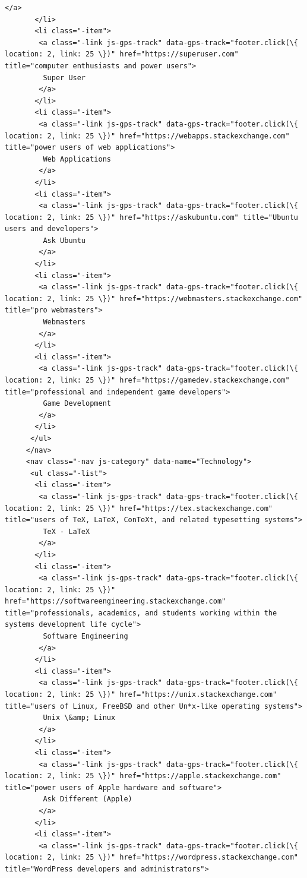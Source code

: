 \documentclass[11pt]{article}
\begin{document}
\begin{Verbatim}[commandchars=\\\{\}]
        </a>
       </li>
       <li class="-item">
        <a class="-link js-gps-track" data-gps-track="footer.click(\{ location: 2, link: 25 \})" href="https://superuser.com" title="computer enthusiasts and power users">
         Super User
        </a>
       </li>
       <li class="-item">
        <a class="-link js-gps-track" data-gps-track="footer.click(\{ location: 2, link: 25 \})" href="https://webapps.stackexchange.com" title="power users of web applications">
         Web Applications
        </a>
       </li>
       <li class="-item">
        <a class="-link js-gps-track" data-gps-track="footer.click(\{ location: 2, link: 25 \})" href="https://askubuntu.com" title="Ubuntu users and developers">
         Ask Ubuntu
        </a>
       </li>
       <li class="-item">
        <a class="-link js-gps-track" data-gps-track="footer.click(\{ location: 2, link: 25 \})" href="https://webmasters.stackexchange.com" title="pro webmasters">
         Webmasters
        </a>
       </li>
       <li class="-item">
        <a class="-link js-gps-track" data-gps-track="footer.click(\{ location: 2, link: 25 \})" href="https://gamedev.stackexchange.com" title="professional and independent game developers">
         Game Development
        </a>
       </li>
      </ul>
     </nav>
     <nav class="-nav js-category" data-name="Technology">
      <ul class="-list">
       <li class="-item">
        <a class="-link js-gps-track" data-gps-track="footer.click(\{ location: 2, link: 25 \})" href="https://tex.stackexchange.com" title="users of TeX, LaTeX, ConTeXt, and related typesetting systems">
         TeX - LaTeX
        </a>
       </li>
       <li class="-item">
        <a class="-link js-gps-track" data-gps-track="footer.click(\{ location: 2, link: 25 \})" href="https://softwareengineering.stackexchange.com" title="professionals, academics, and students working within the systems development life cycle">
         Software Engineering
        </a>
       </li>
       <li class="-item">
        <a class="-link js-gps-track" data-gps-track="footer.click(\{ location: 2, link: 25 \})" href="https://unix.stackexchange.com" title="users of Linux, FreeBSD and other Un*x-like operating systems">
         Unix \&amp; Linux
        </a>
       </li>
       <li class="-item">
        <a class="-link js-gps-track" data-gps-track="footer.click(\{ location: 2, link: 25 \})" href="https://apple.stackexchange.com" title="power users of Apple hardware and software">
         Ask Different (Apple)
        </a>
       </li>
       <li class="-item">
        <a class="-link js-gps-track" data-gps-track="footer.click(\{ location: 2, link: 25 \})" href="https://wordpress.stackexchange.com" title="WordPress developers and administrators">

\end{Verbatim}
\end{document}
